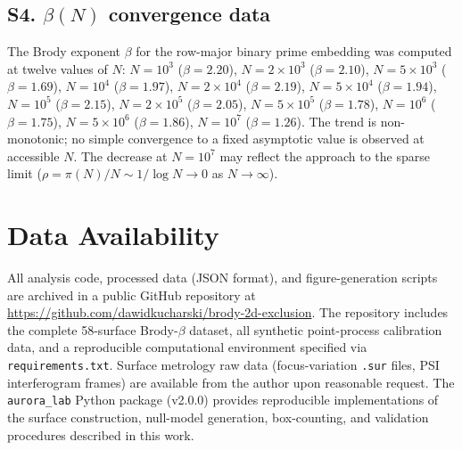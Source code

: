 \documentclass[final,1p,times]{elsarticle}
\theoremstyle{definition}
\begin{document}
\subsection*{S4. $\beta(N)$ convergence data}

The Brody exponent $\beta$ for the row-major binary prime embedding
was computed at twelve values of $N$:
$N=10^3$ ($\beta=2.20$),
$N=2\times10^3$ ($\beta=2.10$),
$N=5\times10^3$ ($\beta=1.69$),
$N=10^4$ ($\beta=1.97$),
$N=2\times10^4$ ($\beta=2.19$),
$N=5\times10^4$ ($\beta=1.94$),
$N=10^5$ ($\beta=2.15$),
$N=2\times10^5$ ($\beta=2.05$),
$N=5\times10^5$ ($\beta=1.78$),
$N=10^6$ ($\beta=1.75$),
$N=5\times10^6$ ($\beta=1.86$),
$N=10^7$ ($\beta=1.26$).
The trend is non-monotonic; no simple convergence to a fixed
asymptotic value is observed at accessible $N$. The decrease at
$N=10^7$ may reflect the approach to the sparse limit
($\rho = \pi(N)/N \sim 1/\log N \to 0$ as $N\to\infty$).

\section*{Data Availability}
All analysis code, processed data (JSON format), and figure-generation
scripts are archived in a public GitHub repository at
\url{https://github.com/dawidkucharski/brody-2d-exclusion}.
The repository includes the complete 58-surface Brody-$\beta$ dataset,
all synthetic point-process calibration data, and a reproducible
computational environment specified via \texttt{requirements.txt}.
Surface metrology raw data (focus-variation \texttt{.sur} files,
PSI interferogram frames) are available from the author upon
reasonable request. The \texttt{aurora\_lab} Python
package (v2.0.0) provides reproducible implementations of the surface
construction, null-model generation, box-counting, and validation
procedures described in this work.

\clearpage


\end{document}
